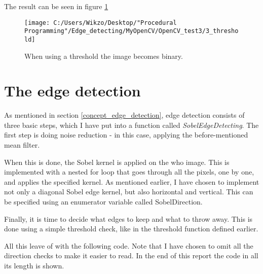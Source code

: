 The result can be seen in figure \ref{threshold_v}

\begin{figure} [htbp]
\texttt{[image: C:/Users/Wikzo/Desktop/"Procedural Programming"/Edge\_detecting/MyOpenCV/OpenCV\_test3/3\_threshold]}
\centering
\caption{When using a threshold the image becomes binary.}
\label{threshold_v}
\end{figure}

\section{The edge detection}
As mentioned in section \ref{concept_edge_detection}, edge detection consists of three basic steps, which I have put into a function called \textit{SobelEdgeDetecting}. The first step  is doing noise reduction - in this case, applying the before-mentioned mean filter.

When this is done, the Sobel kernel is applied on the who image. This is implemented with a nested for loop that goes through all the pixels, one by one, and applies the specified kernel. As mentioned earlier, I have chosen to implement not only a diagonal Sobel edge kernel, but also horizontal and vertical. This can be specified using an enumerator variable called SobelDirection.

Finally, it is time to decide what edges to keep and what to throw away. This is done using a simple threshold check, like in the threshold function defined earlier.

All this leave of with the following code. Note that I have chosen to omit all the direction checks to make it easier to read. In the end of this report the code in all its length is shown.

